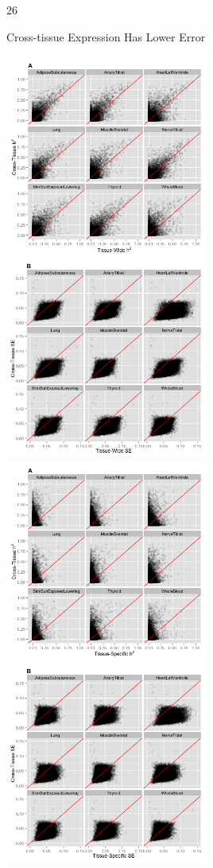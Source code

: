 \documentclass[final]{beamer}
\newcommand{\ColWidth}{26}
\begin{document}
\begin{frame}{}
\begin{textblock}{\ColWidth}
\begin{block}{Cross-tissue Expression Has Lower Error}
	\begin{center}
		\includegraphics[width=0.5\textwidth]{plots/Fig5.png}
		\includegraphics[width=0.5\textwidth]{plots/FigS2.png}
		


\end{center}
\end{block}
\end{textblock}
\end{frame}
\end{document}
